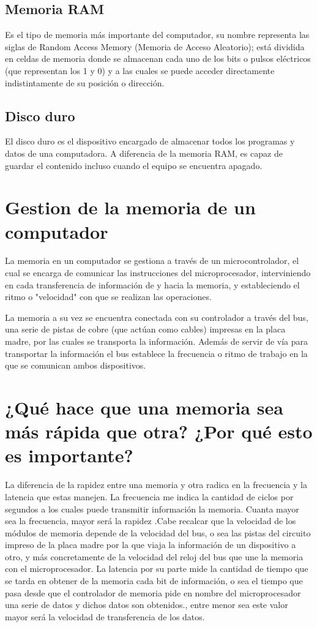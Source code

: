\documentclass{article}
\begin{document}
\subsection{Memoria RAM}
Es el tipo de memoria más importante del computador, su nombre representa las siglas de Random Access Memory (Memoria de Acceso Aleatorio); está dividida en celdas de memoria donde se almacenan cada uno de los bits o pulsos eléctricos (que representan los 1 y 0) y a las cuales se puede acceder directamente indistintamente de su posición o dirección.\cite{rebollo2011memoria}
\subsection{Disco duro}
El disco duro es el dispositivo encargado de almacenar todos los programas y datos de una computadora. A diferencia de la memoria RAM, es capaz de guardar el contenido incluso cuando el equipo se encuentra apagado.\cite{stallings2006organizacion}
\section{Gestion de la memoria de un computador} \label{contenido}
La memoria en un computador se gestiona a través de un microcontrolador, el cual se encarga de comunicar las instrucciones del microprocesador, interviniendo en cada transferencia de información de y hacia la memoria, y estableciendo el ritmo o "velocidad" con que se realizan las operaciones.  

La memoria  a su vez se encuentra conectada con su controlador a través del bus, una serie de pistas de cobre (que actúan como cables) impresas en la placa madre, por las cuales se transporta la información. Además de servir de vía para transportar la información el bus establece la frecuencia o ritmo de trabajo en la que se comunican ambos dispositivos.\cite{youbioit.com}


\section{¿Qué hace que una memoria sea más rápida que otra? ¿Por qué esto es importante? 
} \label{contenido}
%
La diferencia de la rapidez entre una memoria y otra radica en la frecuencia y la latencia que estas manejen. La frecuencia me indica la cantidad de ciclos por segundos a los cuales puede transmitir información la memoria. Cuanta mayor sea la frecuencia, mayor será la rapidez .Cabe recalcar que la velocidad de los módulos de memoria depende de la velocidad del bus, o sea las pistas del circuito impreso de la placa madre por la que viaja la información de un dispositivo a otro, y más concretamente de la velocidad del reloj del bus que une la memoria con el microprocesador. La latencia por su parte mide la cantidad de tiempo que se tarda en obtener de la memoria cada bit de información, o sea el tiempo que pasa desde que el controlador de memoria pide en nombre del microprocesador una serie de datos y dichos datos son obtenidos., entre menor sea este valor mayor será la velocidad de transferencia de los datos.\cite{youbioit.com}
\end{document}
